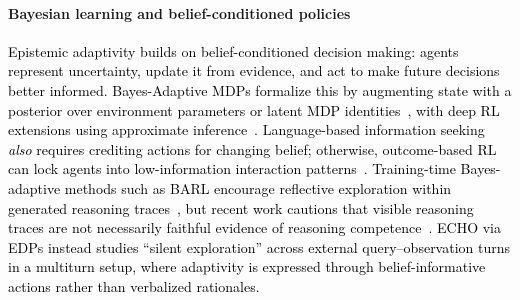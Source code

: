 \documentclass[11pt]{article}
\newcommand{\an}[1]{\textcolor{black}{#1}}
\theoremstyle{plain}
\theoremstyle{definition}
\theoremstyle{remark}
\begin{document}
\paragraph{Bayesian learning and belief-conditioned policies}
\an{Epistemic adaptivity builds on belief-conditioned decision making: agents represent uncertainty, update it from evidence, and act to make future decisions better informed. Bayes-Adaptive MDPs formalize this by augmenting state with a posterior over environment parameters or latent MDP identities~\citep{bellman1956problem,duff2002optimal,Ghavamzadeh_2015}, with deep RL extensions using approximate inference~\citep{Zintgraf2020VariBAD}. Language-based information seeking \textit{also} requires crediting actions for changing belief; otherwise, outcome-based RL can lock agents into low-information interaction patterns~\citep{zou2026informationselflockingreinforcementlearning}. 
Training-time Bayes-adaptive methods such as BARL encourage reflective exploration within generated reasoning traces~\citep{zhang2025markovianreflectiveexplorationbayesadaptive}, but recent work cautions that visible reasoning traces are not necessarily faithful evidence of reasoning competence~\citep{palod2025performative,samineni2025localcoherenceglobalvalidity}. \textsc{ECHO} via EDPs instead studies ``silent exploration'' across external query--observation turns in a multiturn setup, where adaptivity is expressed through belief-informative actions rather than verbalized rationales. }


 
\end{document}
